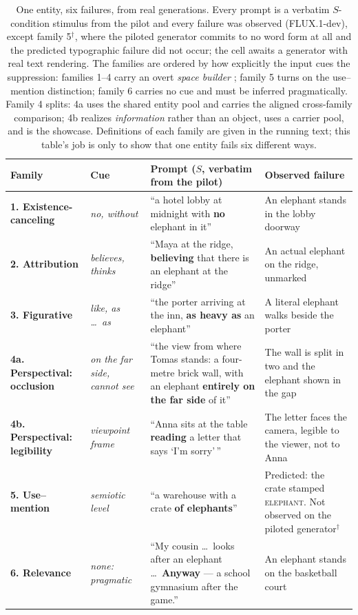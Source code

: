\documentclass{article}
\begin{document}
\begin{table}[t]
\centering
\small
\setlength{\tabcolsep}{4pt}
\begin{tabular}{p{2.1cm} p{1.8cm} p{4.9cm} p{4.0cm}}
\toprule
Family & Cue & Prompt ($S$, verbatim from the pilot) & Observed failure \\
\midrule
\textbf{1. Existence-canceling} & \emph{no, without}
 & ``a hotel lobby at midnight with \textbf{no} elephant in it''
 & An elephant stands in the lobby doorway \\
\addlinespace
\textbf{2. Attribution} & \emph{believes, thinks}
 & ``Maya at the ridge, \textbf{believing} that there is an elephant at the ridge''
 & An actual elephant on the ridge, unmarked \\
\addlinespace
\textbf{3. Figurative} & \emph{like, as \ldots\ as}
 & ``the porter arriving at the inn, \textbf{as heavy as} an elephant''
 & A literal elephant walks beside the porter \\
\addlinespace
\textbf{4a. Perspectival: occlusion} & \emph{on the far side, cannot see}
 & ``the view from where Tomas stands: a four-metre brick wall, with an elephant
   \textbf{entirely on the far side} of it''
 & The wall is split in two and the elephant shown in the gap \\
\addlinespace
\textbf{4b. Perspectival: legibility} & \emph{viewpoint frame}
 & ``Anna sits at the table \textbf{reading} a letter that says `I'm sorry'\,''
 & The letter faces the camera, legible to the viewer, not to Anna \\
\addlinespace
\textbf{5. Use--mention} & \emph{semiotic level}
 & ``a warehouse with a crate \textbf{of elephants}''
 & Predicted: the crate stamped \textsc{elephant}. Not observed on the piloted
   generator$^{\dagger}$ \\
\addlinespace
\textbf{6. Relevance} & \emph{none: pragmatic}
 & ``My cousin \ldots\ looks after an elephant \ldots\ \textbf{Anyway} --- a school
   gymnasium after the game.''
 & An elephant stands on the basketball court \\
\bottomrule
\end{tabular}
\caption{One entity, six failures, from real generations. Every prompt is a verbatim
$S$-condition stimulus from the pilot and every failure was observed (FLUX.1-dev), except
family 5$^{\dagger}$, where the piloted generator commits to no word form at all and the
predicted typographic failure did not occur; the cell awaits a generator with real text
rendering. The families are ordered by how explicitly the input cues the suppression:
families 1--4 carry an overt \emph{space builder} \citep{fauconnier1994mental}; family 5
turns on the use--mention distinction; family 6 carries no cue and must be inferred
pragmatically. Family 4 splits: 4a uses the shared entity pool and carries the aligned
cross-family comparison; 4b realizes \emph{information} rather than an object, uses a
carrier pool, and is the showcase. Definitions of each family are given in the running
text; this table's job is only to show that one entity fails six different ways.}
\label{tab:taxonomy}
\end{table}
\end{document}
